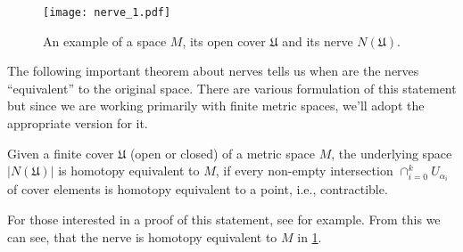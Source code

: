 \begin{figure}[h!]
  \centering
  \texttt{[image: nerve\_1.pdf]}
  \caption{An example of a space $M$, its open cover $\mathfrak{U}$ and its nerve $N(\mathfrak{U})$.}
  \label{fig:nerve_1}
\end{figure}

The following important theorem about nerves tells us when are the nerves ``equivalent'' to the original space. There are various formulation of this statement but since we are working primarily with finite metric spaces, we'll adopt the appropriate version for it.

\begin{theorem}
  Given a finite cover $\mathfrak{U}$ (open or closed) of a metric space $M$, the underlying space $|N(\mathfrak{U})|$ is homotopy equivalent to $M$, if every non-empty intersection $\cap_{i=0}^{k}U_{\alpha_{i}}$ of cover elements is homotopy equivalent to a point, i.e., contractible.
\end{theorem}

For those interested in a proof of this statement, see \cite{Borsuk1948OnTI} for example. From this we can see, that the nerve is homotopy equivalent to $M$ in \ref{fig:nerve_1}.
